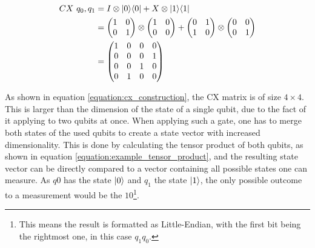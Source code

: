 \begin{equation}
    \centering
    \begin{split}
    CX\ q_0, q_1 &=
    I \otimes |0\rangle\langle0| + X \otimes |1\rangle\langle1| \\
    &= \begin{pmatrix}1 & 0\\0 & 1\end{pmatrix}\otimes\begin{pmatrix}1 & 0 \\ 0 & 0\end{pmatrix} + \begin{pmatrix}0 & 1\\1 & 0\end{pmatrix}\otimes\begin{pmatrix}0 & 0 \\ 0 & 1\end{pmatrix} \\
    &= \begin{pmatrix}
        1 & 0 & 0 & 0 \\
        0 & 0 & 0 & 1 \\
        0 & 0 & 1 & 0 \\
        0 & 1 & 0 & 0
    \end{pmatrix}
    \end{split}
    \label{equation:cx_construction}
\end{equation}

As shown in equation \ref{equation:cx_construction}, the CX matrix is of size $4\times4$. This is larger than the dimension of the state of a single qubit, due to the fact of it applying to two qubits at once. When applying such a gate, one has to merge both states of the used qubits to create a state vector with increased dimensionality. This is done by calculating the tensor product of both qubits, as shown in equation \ref{equation:example_tensor_product}, and the resulting state vector can be directly compared to a vector containing all possible states one can measure. As $q0$ has the state $\ket{0}$ and $q_1$ the state $\ket{1}$, the only possible outcome to a measurement would be the $10$\footnote{This means the result is formatted as Little-Endian, with the first bit being the rightmost one, in this case $q_1q_0$.}.

